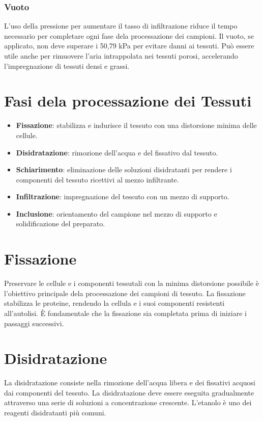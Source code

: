 \subsubsection{Vuoto}
L'uso della pressione per aumentare il tasso di infiltrazione riduce il tempo necessario per completare ogni fase dela processazione dei campioni. Il vuoto, se applicato, non deve superare i 50,79 kPa per evitare danni ai tessuti. Può essere utile anche per rimuovere l'aria intrappolata nei tessuti porosi, accelerando l'impregnazione di tessuti densi e grassi.

\section{Fasi dela processazione dei Tessuti}
\begin{itemize}
    \item \textbf{Fissazione}: stabilizza e indurisce il tessuto con una distorsione minima delle cellule.
    \item \textbf{Disidratazione}: rimozione dell'acqua e del fissativo dal tessuto.
    \item \textbf{Schiarimento}: eliminazione delle soluzioni disidratanti per rendere i componenti del tessuto ricettivi al mezzo infiltrante.
    \item \textbf{Infiltrazione}: impregnazione del tessuto con un mezzo di supporto.
    \item \textbf{Inclusione}: orientamento del campione nel mezzo di supporto e solidificazione del preparato.
\end{itemize}

\section{Fissazione}
Preservare le cellule e i componenti tessutali con la minima distorsione possibile è l'obiettivo principale dela processazione dei campioni di tessuto. La fissazione stabilizza le proteine, rendendo la cellula e i suoi componenti resistenti all'autolisi. È fondamentale che la fissazione sia completata prima di iniziare i passaggi successivi.

\section{Disidratazione}
La disidratazione consiste nella rimozione dell'acqua libera e dei fissativi acquosi dai componenti del tessuto. La disidratazione deve essere eseguita gradualmente attraverso una serie di soluzioni a concentrazione crescente. L'etanolo è uno dei reagenti disidratanti più comuni.

